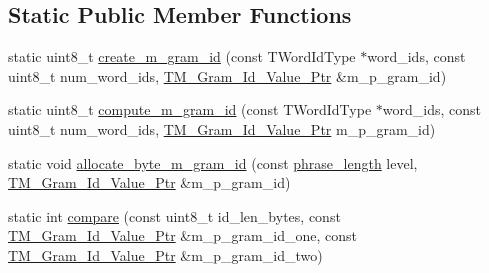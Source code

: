 \subsection*{Static Public Member Functions}
\begin{DoxyCompactItemize}
\item 
static uint8\+\_\+t \hyperlink{classuva_1_1smt_1_1bpbd_1_1server_1_1lm_1_1m__grams_1_1m__gram__id_1_1_byte___m___gram___id_a1e11cda9049d942ac9d528bff727e5da}{create\+\_\+m\+\_\+gram\+\_\+id} (const T\+Word\+Id\+Type $\ast$word\+\_\+ids, const uint8\+\_\+t num\+\_\+word\+\_\+ids, \hyperlink{namespaceuva_1_1smt_1_1bpbd_1_1server_1_1lm_1_1m__grams_1_1m__gram__id_aa605051ded9336178d905e9581702378}{T\+M\+\_\+\+Gram\+\_\+\+Id\+\_\+\+Value\+\_\+\+Ptr} \&m\+\_\+p\+\_\+gram\+\_\+id)
\item 
static uint8\+\_\+t \hyperlink{classuva_1_1smt_1_1bpbd_1_1server_1_1lm_1_1m__grams_1_1m__gram__id_1_1_byte___m___gram___id_a96b6e6d1230b92770a8876afaedf56d2}{compute\+\_\+m\+\_\+gram\+\_\+id} (const T\+Word\+Id\+Type $\ast$word\+\_\+ids, const uint8\+\_\+t num\+\_\+word\+\_\+ids, \hyperlink{namespaceuva_1_1smt_1_1bpbd_1_1server_1_1lm_1_1m__grams_1_1m__gram__id_aa605051ded9336178d905e9581702378}{T\+M\+\_\+\+Gram\+\_\+\+Id\+\_\+\+Value\+\_\+\+Ptr} m\+\_\+p\+\_\+gram\+\_\+id)
\item 
static void \hyperlink{classuva_1_1smt_1_1bpbd_1_1server_1_1lm_1_1m__grams_1_1m__gram__id_1_1_byte___m___gram___id_ab412da39d283c081b4c01949bc9eff88}{allocate\+\_\+byte\+\_\+m\+\_\+gram\+\_\+id} (const \hyperlink{namespaceuva_1_1smt_1_1bpbd_1_1server_af068a19c2e03116caf3e3827a3e40e35}{phrase\+\_\+length} level, \hyperlink{namespaceuva_1_1smt_1_1bpbd_1_1server_1_1lm_1_1m__grams_1_1m__gram__id_aa605051ded9336178d905e9581702378}{T\+M\+\_\+\+Gram\+\_\+\+Id\+\_\+\+Value\+\_\+\+Ptr} \&m\+\_\+p\+\_\+gram\+\_\+id)
\item 
static int \hyperlink{classuva_1_1smt_1_1bpbd_1_1server_1_1lm_1_1m__grams_1_1m__gram__id_1_1_byte___m___gram___id_a6c90aff6fef78378900b706d3ecae096}{compare} (const uint8\+\_\+t id\+\_\+len\+\_\+bytes, const \hyperlink{namespaceuva_1_1smt_1_1bpbd_1_1server_1_1lm_1_1m__grams_1_1m__gram__id_aa605051ded9336178d905e9581702378}{T\+M\+\_\+\+Gram\+\_\+\+Id\+\_\+\+Value\+\_\+\+Ptr} \&m\+\_\+p\+\_\+gram\+\_\+id\+\_\+one, const \hyperlink{namespaceuva_1_1smt_1_1bpbd_1_1server_1_1lm_1_1m__grams_1_1m__gram__id_aa605051ded9336178d905e9581702378}{T\+M\+\_\+\+Gram\+\_\+\+Id\+\_\+\+Value\+\_\+\+Ptr} \&m\+\_\+p\+\_\+gram\+\_\+id\+\_\+two)
\item 

\end{DoxyCompactItemize}
